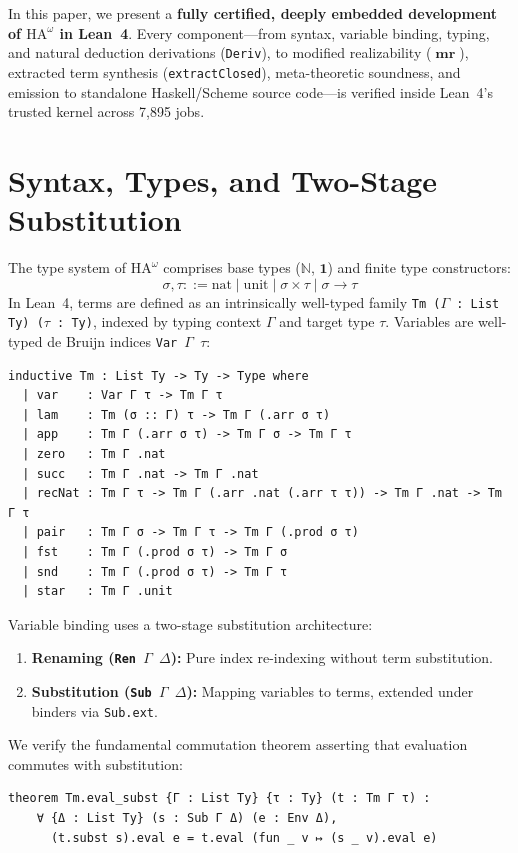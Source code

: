 \documentclass[11pt,a4paper]{article}
\theoremstyle{definition}
\theoremstyle{remark}
\newcommand{\HAomega}{\ensuremath{\mathrm{HA}^\omega}}
\newcommand{\N}{\ensuremath{\mathbb{N}}}
\newcommand{\mr}{\ensuremath{\;\mathbf{mr}\;}}
\begin{document}
In this paper, we present a \textbf{fully certified, deeply embedded development of $\HAomega$ in Lean~4}. Every component---from syntax, variable binding, typing, and natural deduction derivations (\texttt{Deriv}), to modified realizability ($\mr$), extracted term synthesis (\texttt{extractClosed}), meta-theoretic soundness, and emission to standalone Haskell/Scheme source code---is verified inside Lean~4's trusted kernel across 7,895 jobs.

\section{Syntax, Types, and Two-Stage Substitution}

The type system of $\HAomega$ comprises base types ($\N$, $\mathbf{1}$) and finite type constructors:
\[
\sigma, \tau ::= \mathrm{nat} \mid \mathrm{unit} \mid \sigma \times \tau \mid \sigma \to \tau
\]
In Lean~4, terms are defined as an intrinsically well-typed family \texttt{Tm ($\Gamma$ : List Ty) ($\tau$ : Ty)}, indexed by typing context $\Gamma$ and target type $\tau$. Variables are well-typed de Bruijn indices \texttt{Var $\Gamma$ $\tau$}:
\begin{lstlisting}[language=Lean]
inductive Tm : List Ty -> Ty -> Type where
  | var    : Var Γ τ -> Tm Γ τ
  | lam    : Tm (σ :: Γ) τ -> Tm Γ (.arr σ τ)
  | app    : Tm Γ (.arr σ τ) -> Tm Γ σ -> Tm Γ τ
  | zero   : Tm Γ .nat
  | succ   : Tm Γ .nat -> Tm Γ .nat
  | recNat : Tm Γ τ -> Tm Γ (.arr .nat (.arr τ τ)) -> Tm Γ .nat -> Tm Γ τ
  | pair   : Tm Γ σ -> Tm Γ τ -> Tm Γ (.prod σ τ)
  | fst    : Tm Γ (.prod σ τ) -> Tm Γ σ
  | snd    : Tm Γ (.prod σ τ) -> Tm Γ τ
  | star   : Tm Γ .unit
\end{lstlisting}

Variable binding uses a two-stage substitution architecture:
\begin{enumerate}
    \item \textbf{Renaming (\texttt{Ren $\Gamma$ $\Delta$}):} Pure index re-indexing without term substitution.
    \item \textbf{Substitution (\texttt{Sub $\Gamma$ $\Delta$}):} Mapping variables to terms, extended under binders via \texttt{Sub.ext}.
\end{enumerate}
We verify the fundamental commutation theorem asserting that evaluation commutes with substitution:
\begin{lstlisting}[language=Lean]
theorem Tm.eval_subst {Γ : List Ty} {τ : Ty} (t : Tm Γ τ) :
    ∀ {Δ : List Ty} (s : Sub Γ Δ) (e : Env Δ),
      (t.subst s).eval e = t.eval (fun _ v ↦ (s _ v).eval e)
\end{lstlisting}
\end{document}
